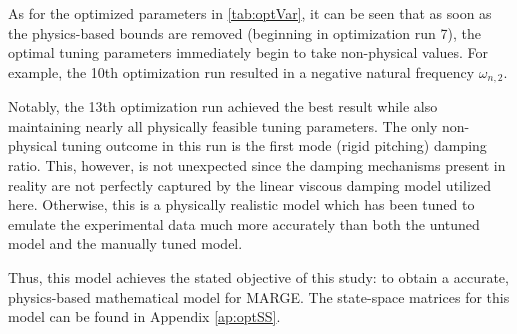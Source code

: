 As for the optimized parameters in \ref{tab:optVar}, it can be seen that as soon as the physics-based bounds are removed (beginning in optimization run 7), the optimal tuning parameters immediately begin to take non-physical values. For example, the 10th optimization run resulted in a negative natural frequency $\omega_{n,2}$.

Notably, the 13th optimization run achieved the best result while also maintaining nearly all physically feasible tuning parameters. The only non-physical tuning outcome in this run is the first mode (rigid pitching) damping ratio. This, however, is not unexpected since the damping mechanisms present in reality are not perfectly captured by the linear viscous damping model utilized here. Otherwise, this is a physically realistic model which has been tuned to emulate the experimental data much more accurately than both the untuned model and the manually tuned model.

Thus, this model achieves the stated objective of this study: to obtain a accurate, physics-based mathematical model for MARGE. The state-space matrices for this model can be found in Appendix \ref{ap:optSS}.

%
%
%
%
%
%
%
%
